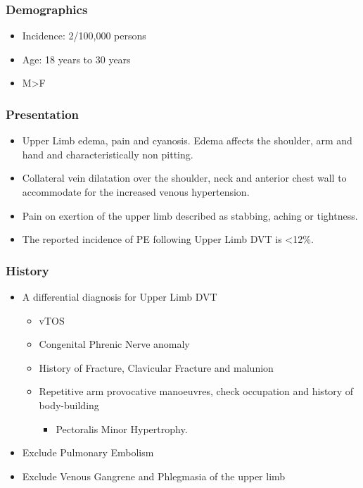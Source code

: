 \documentclass[
]{book}
\providecommand{\tightlist}{%
  \setlength{\itemsep}{0pt}\setlength{\parskip}{0pt}}
\begin{document}
\hypertarget{demographics}{%
\subsubsection{Demographics}\label{demographics}}

\begin{itemize}
\item
  Incidence: 2/100,000 persons
\item
  Age: 18 years to 30 years
  \citep{illigComprehensiveReviewPagetSchroetter2010}
\item
  M\textgreater F
\end{itemize}

\hypertarget{presentation}{%
\subsubsection{Presentation}\label{presentation}}

\begin{itemize}
\item
  Upper Limb edema, pain and cyanosis. Edema affects the shoulder, arm
  and hand and characteristically non pitting.
\item
  Collateral vein dilatation over the shoulder, neck and anterior
  chest wall to accommodate for the increased venous hypertension.
  \citep{humphries123ThoracicOutlet2019}
\item
  Pain on exertion of the upper limb described as stabbing, aching or
  tightness.
\item
  The reported incidence of PE following Upper Limb DVT is \textless12\%.
  \citep{humphries123ThoracicOutlet2019}
\end{itemize}

\hypertarget{history}{%
\subsubsection{History}\label{history}}

\begin{itemize}
\item
  A differential diagnosis for Upper Limb DVT

  \begin{itemize}
  \item
    vTOS
  \item
    Congenital Phrenic Nerve anomaly
  \item
    History of Fracture, Clavicular Fracture and malunion
  \item
    Repetitive arm provocative manoeuvres, check occupation and
    history of body-building

    \begin{itemize}
    \tightlist
    \item
      Pectoralis Minor Hypertrophy.
    \end{itemize}
  \end{itemize}
\item
  Exclude Pulmonary Embolism~
\item
  Exclude Venous Gangrene and Phlegmasia of the upper limb
\end{itemize}
\end{document}
